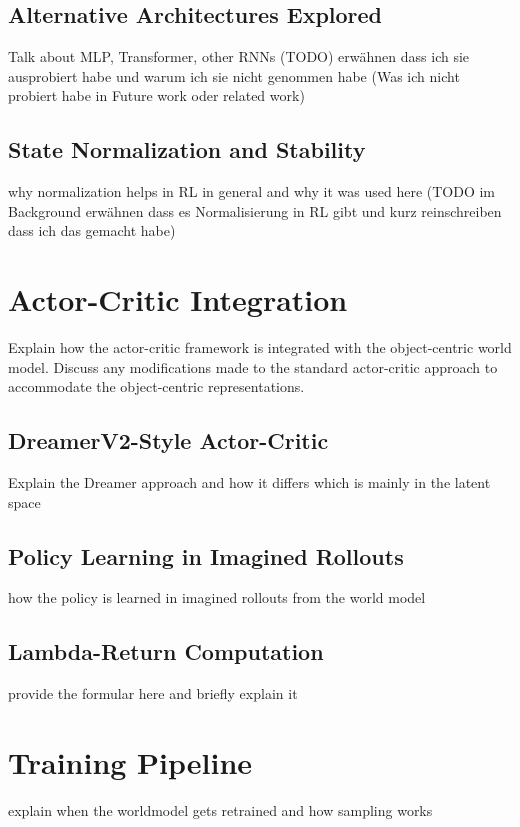 \documentclass[
	english,
	ruledheaders=section,
	class=report,
	thesis={type=master},
	accentcolor=9c,
	custommargins=true,
	marginpar=false,
	parskip=half-,
	fontsize=11pt,
]{tudapub}
\begin{document}
\subsection{Alternative Architectures Explored}
\label{subsec:alternative_architectures}
Talk about MLP, Transformer, other RNNs
(TODO) erwähnen dass ich sie ausprobiert habe und warum ich sie nicht genommen habe
(Was ich nicht probiert habe in Future work oder related work)

\subsection{State Normalization and Stability}
\label{subsec:normalization}
why normalization helps in RL in general and why it was used here
(TODO im Background erwähnen dass es Normalisierung in RL gibt und kurz reinschreiben dass ich das gemacht habe)

\section{Actor-Critic Integration}
\label{sec:actor_critic}
Explain how the actor-critic framework is integrated with the object-centric world model.
Discuss any modifications made to the standard actor-critic approach to accommodate the
object-centric representations.

\subsection{DreamerV2-Style Actor-Critic}
\label{subsec:dreamer_ac}
Explain the Dreamer approach and how it differs which is mainly in the latent space

\subsection{Policy Learning in Imagined Rollouts}
\label{subsec:imagined_rollouts}
how the policy is learned in imagined rollouts from the world model

\subsection{Lambda-Return Computation}
\label{subsec:lambda_returns}
provide the formular here and briefly explain it

\section{Training Pipeline}
\label{sec:training_pipeline}
explain when the worldmodel gets retrained and how sampling works
\end{document}
